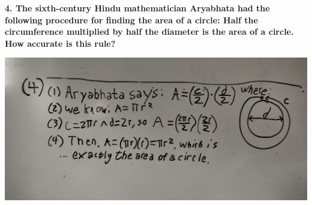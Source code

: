 \documentclass[12pt]{article}
\begin{document}
\pagebreak
\textbf{4. The sixth-century Hindu mathematician Aryabhata had the following procedure for finding the area of a circle: Half the circumference multiplied by half the diameter is the area of a circle. How accurate is this rule?}
\medskip

\includegraphics[scale=0.08]{4.jpg}
\end{document}
